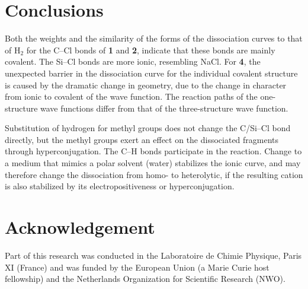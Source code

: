 \section{Conclusions}

Both the weights and the similarity of the forms of the dissociation curves to that of H$_2$ for the C--Cl bonds of \textbf{1} and \textbf{2}, indicate that these bonds are mainly covalent.  The Si--Cl bonds are more ionic, resembling NaCl.  For \textbf{4}, the unexpected barrier in the dissociation curve for the individual covalent structure is caused by the dramatic change in geometry, due to the change in character from ionic to covalent of the wave function.  The reaction paths of the one-structure wave functions differ from that of the three-structure wave function.

Substitution of hydrogen for methyl groups does not change the C/Si--Cl bond directly, but the methyl groups exert an effect on the dissociated fragments through hyperconjugation.  The C--H bonds participate in the reaction.  Change to a medium that mimics a polar solvent (water) stabilizes the ionic curve, and may therefore change the dissociation from homo- to heterolytic, if the resulting cation is also stabilized by its electropositiveness or hyperconjugation.
 
\section*{Acknowledgement}

Part of this research was conducted in the Laboratoire de Chimie Physique, Paris XI (France) and was funded by the European Union (a Marie Curie host fellowship) and the Netherlands Organization for Scientific Research (NWO).



